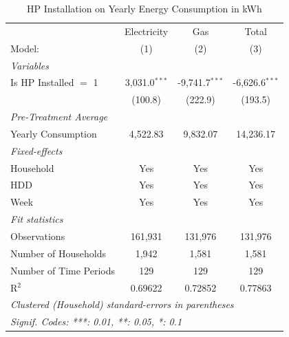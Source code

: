 
\begin{table}[htbp]
   \caption{HP Installation on Yearly Energy Consumption in kWh}
   \centering
   \begin{tabular}{lccc}
      \tabularnewline \midrule \midrule
                                     & Electricity     & Gas              & Total \\   
      Model:                         & (1)             & (2)              & (3)\\  
      \midrule
      \emph{Variables}\\
      Is HP Installed $=$ 1          & 3,031.0$^{***}$ & -9,741.7$^{***}$ & -6,626.6$^{***}$\\   
                                     & (100.8)         & (222.9)          & (193.5)\\   
      \midrule
\emph{Pre-Treatment Average}\\
      Yearly Consumption             & 4,522.83        & 9,832.07         & 14,236.17\\  
\midrule
      \emph{Fixed-effects}\\
      Household                      & Yes             & Yes              & Yes\\  
      HDD                            & Yes             & Yes              & Yes\\  
      Week                           & Yes             & Yes              & Yes\\  
      \midrule
      \emph{Fit statistics}\\
      Observations                   & 161,931         & 131,976          & 131,976\\  
      Number of Households & 1,942           & 1,581            & 1,581\\  
      Number of Time Periods         & 129             & 129              & 129\\  
      R$^2$                          & 0.69622         & 0.72852          & 0.77863\\  
      \midrule \midrule
      \multicolumn{4}{l}{\emph{Clustered (Household) standard-errors in parentheses}}\\
      \multicolumn{4}{l}{\emph{Signif. Codes: ***: 0.01, **: 0.05, *: 0.1}}\\
   \end{tabular}
\end{table}


